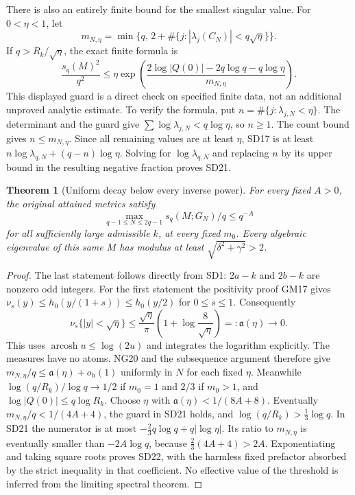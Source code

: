 \documentclass[11pt]{article}
\newtheorem{theorem}{Theorem}\newtheorem{lemma}[theorem]{Lemma}
\begin{document}
There is also an entirely finite bound for the smallest singular value.
For $0<\eta<1$, let
\begin{equation}\tag{SD20}
 m_{N,\eta}=\min\{q,\,2+\#\{j:|\lambda_j(C_N)|<q\sqrt\eta\}\}.
\end{equation}
If $q>R_k/\sqrt\eta$, the exact finite formula is
\begin{equation}\tag{SD21}
\boxed{\frac{s_q(M)^2}{q^2}
\le\eta\exp\!\left(
\frac{2\log|Q(0)|-2q\log q-q\log\eta}{m_{N,\eta}}
\right).}
\end{equation}
This displayed guard is a direct check on specified finite data, not
an additional unproved analytic estimate. To verify the formula, put
$n=\#\{j:\lambda_{j,N}<\eta\}$. The determinant and the guard give
$\sum\log\lambda_{j,N}<q\log\eta$, so $n\ge1$. The count bound
gives $n\le m_{N,\eta}$. Since all remaining values are at least
$\eta$, SD17 is at least $n\log\lambda_{q,N}+(q-n)\log\eta$.
Solving for $\log\lambda_{q,N}$ and replacing $n$ by its upper bound
in the resulting negative fraction proves SD21.

\begin{theorem}[Uniform decay below every inverse power]
For every fixed $A>0$, the original attained metrics satisfy
\begin{equation}\tag{SD22}
\boxed{\max_{q-1\le N\le2q-1}s_q(M;G_N)/q\le q^{-A}}
\end{equation}
for all sufficiently large admissible $k$, at every fixed $m_0$.
Every algebraic eigenvalue of this same $M$ has modulus at least
$\sqrt{\delta^2+\gamma^2}>2$.
\end{theorem}
\begin{proof}
The last statement follows directly from SD1: $2a-k$ and $2b-k$ are
nonzero odd integers. For the first statement the positivity proof
GM17 gives $\nu_s(y)\le h_0(y/(1+s))\le h_0(y/2)$ for $0\le s\le1$.
Consequently
\begin{equation}\tag{SD23}
\nu_s\{|y|<\sqrt\eta\}
\le\frac{\sqrt\eta}{\pi}
\left(1+\log\frac8{\sqrt\eta}\right)=:\mathfrak a(\eta)
\longrightarrow0.
\end{equation}
This uses $\operatorname{arcosh}u\le\log(2u)$ and integrates the
logarithm explicitly. The measures have no atoms. NG20 and the
subsequence argument therefore give $m_{N,\eta}/q\le
\mathfrak a(\eta)+o_h(1)$ uniformly in $N$ for each fixed $\eta$.
Meanwhile $\log(q/R_k)/\log q\to1/2$ if $m_0=1$ and $2/3$ if
$m_0>1$, and $\log|Q(0)|\le q\log R_k$. Choose $\eta$ with
$\mathfrak a(\eta)<1/(8A+8)$. Eventually $m_{N,\eta}/q<1/(4A+4)$,
the guard in SD21 holds, and $\log(q/R_k)>\tfrac13\log q$.
In SD21 the numerator is at most
$-\tfrac23q\log q+q|\log\eta|$.
Its ratio to $m_{N,\eta}$ is eventually smaller than $-2A\log q$,
because $\tfrac23(4A+4)>2A$. Exponentiating and taking square roots
proves SD22, with the harmless fixed prefactor absorbed by the strict
inequality in that coefficient. No effective value of the threshold
is inferred from the limiting spectral theorem.
\end{proof}
\end{document}
